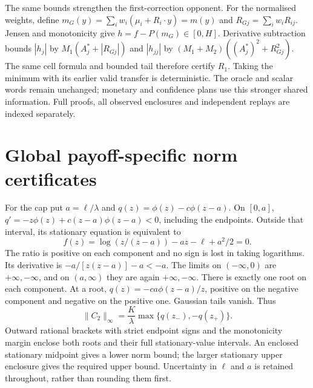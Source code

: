 \documentclass[11pt]{article}
\begin{document}
The same bounds strengthen the first-correction opponent. For the normalised
weights, define $m_G(y)=\sum_iw_i(\mu_i+R_i\cdot y)=m(y)$ and
$R_{Gj}=\sum_iw_iR_{ij}$. Jensen and monotonicity give
$h=f-P(m_G)\in[0,H]$. Derivative subtraction bounds
$|h_j|$ by $M_1(A_j^*+|R_{Gj}|)$ and $|h_{jj}|$ by
$(M_1+M_2)((A_j^*)^2+R_{Gj}^2)$. The same cell formula and bounded tail
therefore certify $R_1$. Taking the minimum with its earlier valid transfer
is deterministic. The oracle and scalar words remain unchanged; monetary
and confidence plans use this stronger shared information. Full proofs,
all observed enclosures and independent replays are indexed separately.

\section{Global payoff-specific norm certificates}
\label{app:payoff-norms}

For the cap put $a=\ell/\lambda$ and
$q(z)=\phi(z)-c\phi(z-a)$. On $[0,a]$,
$q'=-z\phi(z)+c(z-a)\phi(z-a)<0$, including the endpoints.
Outside that interval, its stationary equation is equivalent to
\begin{equation}
 f(z)=\log(z/(z-a))-az-\ell+a^2/2=0.
\end{equation}
The ratio is positive on each component and no sign is lost in taking
logarithms. Its derivative is $-a/[z(z-a)]-a<-a$.
The limits on $(-\infty,0)$ are $+\infty,-\infty$, and on
$(a,\infty)$ they are again $+\infty,-\infty$. There is exactly one
root on each component. At a root,
$q(z)=-ca\phi(z-a)/z$, positive on the negative component and negative
on the positive one. Gaussian tails vanish. Thus
\begin{equation}
 \|C_2\|_\infty=\frac K\lambda
 \max\{q(z_-),-q(z_+)\}.
\end{equation}
Outward rational brackets with strict endpoint signs and the monotonicity
margin enclose both roots and their full stationary-value intervals.
An enclosed stationary midpoint gives a lower norm bound; the larger
stationary upper enclosure gives the required upper bound. Uncertainty in
$\ell$ and $a$ is retained throughout, rather than rounding them first.
\end{document}
